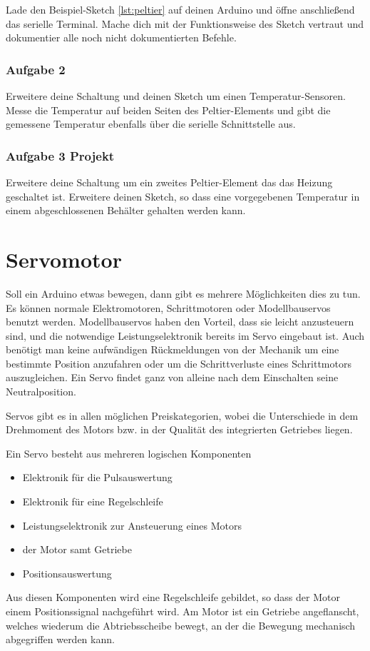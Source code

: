 Lade den Beispiel-Sketch \ref{lst:peltier} auf deinen Arduino und öffne anschließend das serielle Terminal. Mache dich mit der Funktionsweise des Sketch vertraut und dokumentier alle noch nicht dokumentierten Befehle.

\subsubsection{Aufgabe 2}
Erweitere deine Schaltung und deinen Sketch um einen Temperatur-Sensoren. Messe die Temperatur auf beiden Seiten des Peltier-Elements und gibt die gemessene Temperatur ebenfalls über die serielle Schnittstelle aus.
  
\subsubsection{Aufgabe 3 Projekt}
Erweitere deine Schaltung um ein zweites Peltier-Element das das Heizung geschaltet ist. Erweitere deinen Sketch, so dass eine vorgegebenen Temperatur in einem abgeschlossenen Behälter gehalten werden kann.    


\section{Servomotor}
Soll ein Arduino etwas bewegen, dann gibt es mehrere Möglichkeiten dies zu tun. Es können normale 
Elektromotoren, Schrittmotoren oder Modellbauservos benutzt werden. Modellbauservos haben den 
Vorteil, dass sie leicht anzusteuern sind, und die notwendige Leistungselektronik bereits im Servo 
eingebaut ist. Auch benötigt man keine aufwändigen Rückmeldungen von der Mechanik um eine 
bestimmte Position anzufahren oder um die Schrittverluste eines Schrittmotors auszugleichen. 
Ein Servo findet ganz von alleine nach dem Einschalten seine Neutralposition. 

Servos gibt es in allen möglichen Preiskategorien, wobei die Unterschiede in dem Drehmoment des Motors bzw. in der Qualität des integrierten Getriebes liegen. 

Ein Servo besteht aus mehreren logischen Komponenten

\begin{itemize}
\item Elektronik für die Pulsauswertung
\item Elektronik für eine Regelschleife
\item Leistungselektronik zur Ansteuerung eines Motors
\item der Motor samt Getriebe
\item Positionsauswertung
\end{itemize}
Aus diesen Komponenten wird eine Regelschleife gebildet, so dass der Motor einem 
Positionssignal nachgeführt wird. Am Motor ist ein Getriebe angeflanscht, welches wiederum 
die Abtriebsscheibe bewegt, an der die Bewegung mechanisch abgegriffen werden kann.

